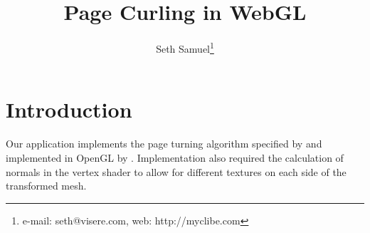 \documentclass{acmsiggraph}                     %
\title{Page Curling in WebGL}
\author{Seth Samuel\thanks{e-mail: seth@visere.com, web: http://myclibe.com} }
\begin{document}


\maketitle


\begin{abstract}

\end{abstract}




\section{Introduction}


 \copyrightspace

Our application implements the page turning algorithm specified by \cite{Lichan-Hong:2004fk} and implemented in OpenGL by \cite{Nuon:uq}. Implementation also required the calculation of normals in the vertex shader to allow for different textures on each side of the transformed mesh.
\end{document}
